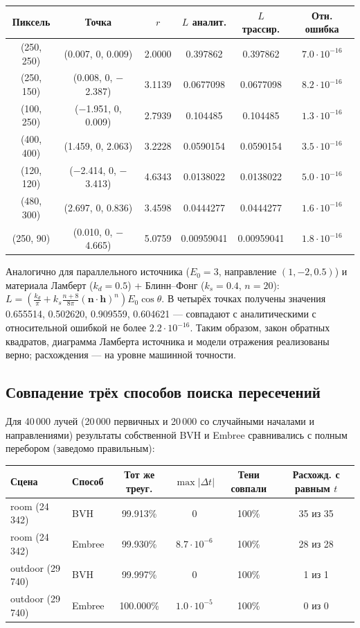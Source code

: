 \documentclass[12pt,a4paper]{article}
\newcommand{\vect}[1]{\mathbf{#1}}
\begin{document}
\begin{center}
\small
\begin{tabular}{cccccc}
\toprule
Пиксель & Точка & $r$ & $L$ аналит. & $L$ трассир. & Отн. ошибка \\
\midrule
(250, 250) & (0.007, 0, 0.009) & 2.0000 & 0.397862 & 0.397862 & $7.0\cdot10^{-16}$ \\
(250, 150) & (0.008, 0, $-$2.387) & 3.1139 & 0.0677098 & 0.0677098 & $8.2\cdot10^{-16}$ \\
(100, 250) & ($-$1.951, 0, 0.009) & 2.7939 & 0.104485 & 0.104485 & $1.3\cdot10^{-16}$ \\
(400, 400) & (1.459, 0, 2.063) & 3.2228 & 0.0590154 & 0.0590154 & $3.5\cdot10^{-16}$ \\
(120, 120) & ($-$2.414, 0, $-$3.413) & 4.6343 & 0.0138022 & 0.0138022 & $5.0\cdot10^{-16}$ \\
(480, 300) & (2.697, 0, 0.836) & 3.4598 & 0.0444277 & 0.0444277 & $1.6\cdot10^{-16}$ \\
(250, 90) & (0.010, 0, $-$4.665) & 5.0759 & 0.00959041 & 0.00959041 & $1.8\cdot10^{-16}$ \\
\bottomrule
\end{tabular}
\end{center}

Аналогично для параллельного источника ($E_0=3$, направление $(1,-2,0.5)$) и материала Ламберт ($k_d=0.5$) +
Блинн–Фонг ($k_s=0.4$, $n=20$): $L = \left(\frac{k_d}{\pi} + k_s\frac{n+8}{8\pi}(\vect n\cdot\vect h)^n\right)E_0\cos\theta$.
В четырёх точках получены значения 0.655514, 0.502620, 0.909559, 0.604621 — совпадают с аналитическими с
относительной ошибкой не более $2.2\cdot10^{-16}$. Таким образом, закон обратных квадратов, диаграмма Ламберта
источника и модели отражения реализованы верно; расхождения — на уровне машинной точности.

\subsection{Совпадение трёх способов поиска пересечений}

Для 40\,000 лучей (20\,000 первичных и 20\,000 со случайными началами и направлениями) результаты собственной BVH и Embree
сравнивались с полным перебором (заведомо правильным):

\begin{center}
\small
\begin{tabular}{llcccc}
\toprule
Сцена & Способ & Тот же треуг. & $\max|\Delta t|$ & Тени совпали & Расхожд. с равным $t$ \\
\midrule
room (24\,342) & BVH & 99.913\% & 0 & 100\% & 35 из 35 \\
room (24\,342) & Embree & 99.930\% & $8.7\cdot10^{-6}$ & 100\% & 28 из 28 \\
outdoor (29\,740) & BVH & 99.997\% & 0 & 100\% & 1 из 1 \\
outdoor (29\,740) & Embree & 100.000\% & $1.0\cdot10^{-5}$ & 100\% & 0 из 0 \\
\bottomrule
\end{tabular}
\end{center}
\end{document}
